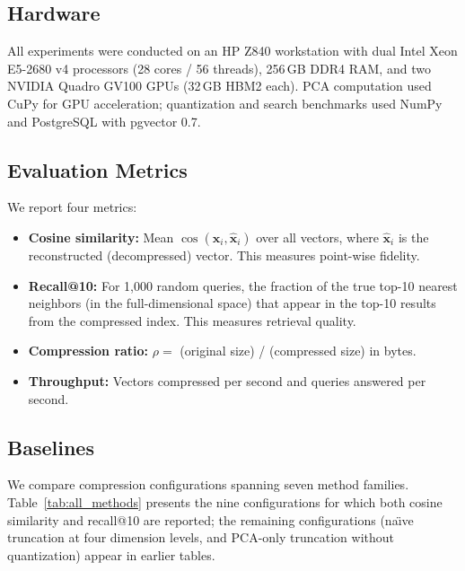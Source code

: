 \documentclass[journal]{IEEEtran}
\newcommand{\cossim}{\operatorname{cos}}
\begin{document}
\subsection{Hardware}

All experiments were conducted on an HP Z840 workstation with dual Intel Xeon E5-2680 v4 processors (28 cores / 56 threads), 256\,GB DDR4 RAM, and two NVIDIA Quadro GV100 GPUs (32\,GB HBM2 each).
PCA computation used CuPy for GPU acceleration; quantization and search benchmarks used NumPy and PostgreSQL with pgvector 0.7.

\subsection{Evaluation Metrics}

We report four metrics:
\begin{itemize}
  \item \textbf{Cosine similarity:} Mean $\cossim(\mathbf{x}_i, \hat{\mathbf{x}}_i)$ over all vectors, where $\hat{\mathbf{x}}_i$ is the reconstructed (decompressed) vector.
  This measures point-wise fidelity.
  \item \textbf{Recall@10:} For 1,000 random queries, the fraction of the true top-10 nearest neighbors (in the full-dimensional space) that appear in the top-10 results from the compressed index.
  This measures retrieval quality.
  \item \textbf{Compression ratio:} $\rho = $ (original size) / (compressed size) in bytes.
  \item \textbf{Throughput:} Vectors compressed per second and queries answered per second.
\end{itemize}

\subsection{Baselines}

We compare compression configurations spanning seven method families.
Table~\ref{tab:all_methods} presents the nine configurations for which
both cosine similarity and recall@10 are reported; the remaining
configurations (na\"{\i}ve truncation at four dimension levels, and
PCA-only truncation without quantization) appear in earlier tables.
\end{document}
